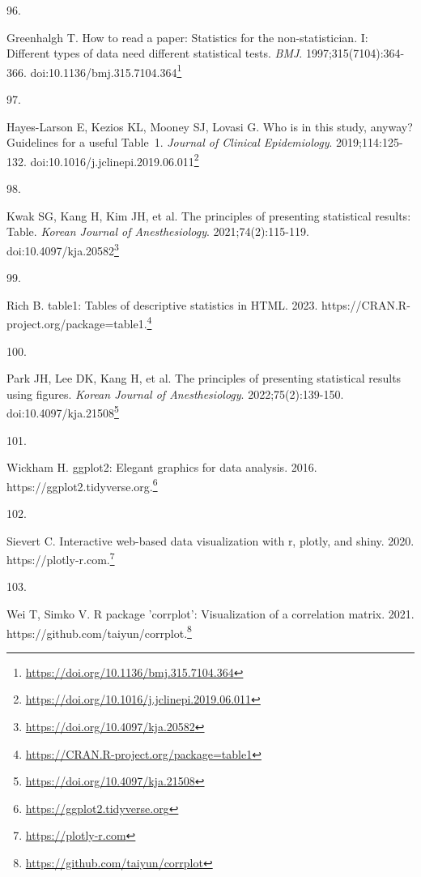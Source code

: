 \documentclass[
  a4paper,
]{book}
\newlength{\cslhangindent}
\newlength{\csllabelwidth}
\newlength{\cslentryspacingunit} %
\newenvironment{CSLReferences}[2] %
 {%
  \setlength{\parindent}{0pt}
  \ifodd #1
  \let\oldpar\par
  \def\par{\hangindent=\cslhangindent\oldpar}
  \fi
  \setlength{\parskip}{#2\cslentryspacingunit}
 }%
 {}
\newcommand{\CSLLeftMargin}[1]{\parbox[t]{\csllabelwidth}{#1}}
\newcommand{\CSLRightInline}[1]{\parbox[t]{\linewidth - \csllabelwidth}{#1}\break}
\renewcommand{\href}[2]{#2\footnote{\url{#1}}}
\begin{document}
\begin{CSLReferences}{0}{0}
\leavevmode{}%
\CSLLeftMargin{96. }%
\CSLRightInline{Greenhalgh T. How to read a paper: Statistics for the non-statistician. I: Different types of data need different statistical tests. \emph{BMJ}. 1997;315(7104):364-366. doi:\href{https://doi.org/10.1136/bmj.315.7104.364}{10.1136/bmj.315.7104.364}}

\leavevmode{}%
\CSLLeftMargin{97. }%
\CSLRightInline{Hayes-Larson E, Kezios KL, Mooney SJ, Lovasi G. Who is in this study, anyway? Guidelines for a useful Table~1. \emph{Journal of Clinical Epidemiology}. 2019;114:125-132. doi:\href{https://doi.org/10.1016/j.jclinepi.2019.06.011}{10.1016/j.jclinepi.2019.06.011}}

\leavevmode{}%
\CSLLeftMargin{98. }%
\CSLRightInline{Kwak SG, Kang H, Kim JH, et al. The principles of presenting statistical results: Table. \emph{Korean Journal of Anesthesiology}. 2021;74(2):115-119. doi:\href{https://doi.org/10.4097/kja.20582}{10.4097/kja.20582}}

\leavevmode{}%
\CSLLeftMargin{99. }%
\CSLRightInline{Rich B. table1: Tables of descriptive statistics in HTML. 2023. \href{https://CRAN.R-project.org/package=table1}{https://CRAN.R-project.org/package=table1.}}

\leavevmode{}%
\CSLLeftMargin{100. }%
\CSLRightInline{Park JH, Lee DK, Kang H, et al. The principles of presenting statistical results using figures. \emph{Korean Journal of Anesthesiology}. 2022;75(2):139-150. doi:\href{https://doi.org/10.4097/kja.21508}{10.4097/kja.21508}}

\leavevmode{}%
\CSLLeftMargin{101. }%
\CSLRightInline{Wickham H. ggplot2: Elegant graphics for data analysis. 2016. \href{https://ggplot2.tidyverse.org}{https://ggplot2.tidyverse.org.}}

\leavevmode{}%
\CSLLeftMargin{102. }%
\CSLRightInline{Sievert C. Interactive web-based data visualization with r, plotly, and shiny. 2020. \href{https://plotly-r.com}{https://plotly-r.com.}}

\leavevmode{}%
\CSLLeftMargin{103. }%
\CSLRightInline{Wei T, Simko V. R package 'corrplot': Visualization of a correlation matrix. 2021. \href{https://github.com/taiyun/corrplot}{https://github.com/taiyun/corrplot.}}


\end{CSLReferences}
\end{document}
